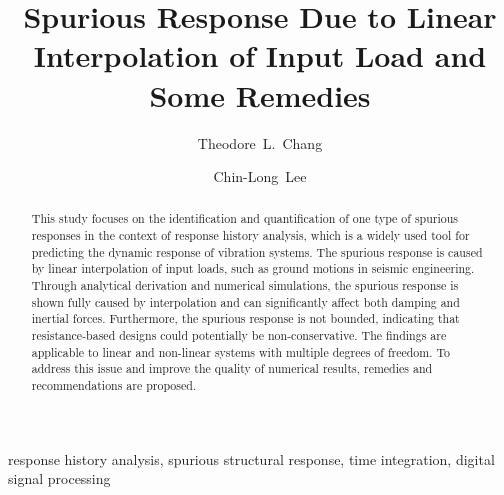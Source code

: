 \documentclass[3p,sort&compress,11pt,fleqn,review]{elsarticle}
\begin{document}
\linenumbers
\begin{abstract}
\begin{linenumbers}
This study focuses on the identification and quantification of one type of spurious responses in the context of response history analysis, which is a widely used tool for predicting the dynamic response of vibration systems. The spurious response is caused by linear interpolation of input loads, such as ground motions in seismic engineering. Through analytical derivation and numerical simulations, the spurious response is shown fully caused by interpolation and can significantly affect both damping and inertial forces. Furthermore, the spurious response is not bounded, indicating that resistance-based designs could potentially be non-conservative. The findings are applicable to linear and non-linear systems with multiple degrees of freedom. To address this issue and improve the quality of numerical results, remedies and recommendations are proposed.
\end{linenumbers}
\end{abstract}
\begin{keyword}
response history analysis\sep
spurious structural response\sep
time integration\sep
digital signal processing
\end{keyword}
\begin{frontmatter}
\title{Spurious Response Due to Linear Interpolation of Input Load and Some Remedies}
\author[add1]{Theodore~L.~Chang}
\author[add2]{Chin-Long~Lee}
\address[add1]{IRIS Adlershof, Humboldt-Universität zu Berlin, Berlin, Germany, 12489.}
\address[add2]{Department of Civil and Natural Resources Engineering, University of Canterbury, Christchurch, New Zealand, 8041.}
\end{frontmatter}




\end{document}
